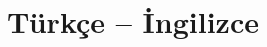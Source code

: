 
\section*{Türkçe -- İngilizce}

\ifdefined\HCode
\def\ltdevam{}
\else
\def\ltdevam{%
\toprule
\textbf{Türkçe Terim (devam)} & \textbf{İngilizce Karşılık} \\
\midrule
\endhead
\midrule
\multicolumn{2}{r}{\small\textit{(devamı sonraki sayfada)}} \\
\endfoot
\bottomrule
\endlastfoot}
\fi

